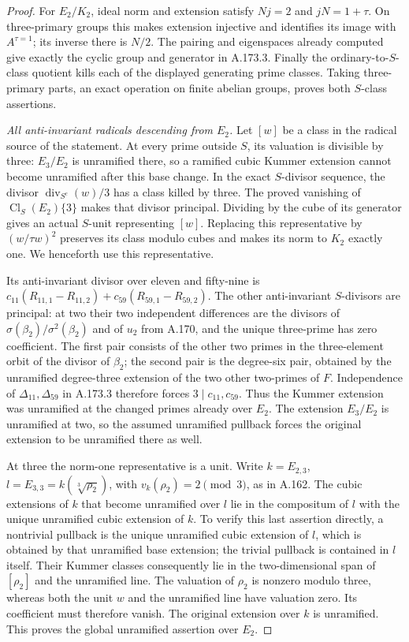 \begin{proof}
For \(E_2/K_2\), ideal norm and extension satisfy
\(Nj=2\) and \(jN=1+\tau\).  On three-primary groups this
makes extension injective and identifies its image with
\(A^{\tau=1}\); its inverse there is \(N/2\).
The pairing and eigenspaces already computed give exactly
the cyclic group and generator in A.173.3.
Finally the ordinary-to-\(S\)-class quotient kills each of
the displayed generating prime classes.  Taking three-primary
parts, an exact operation on finite abelian groups, proves
both \(S\)-class assertions.

\emph{All anti-invariant radicals descending from \(E_2\).}
Let \([w]\) be a class in the radical source of the statement.
At every prime outside \(S\), its valuation is divisible by
three: \(E_3/E_2\) is unramified there, so a ramified cubic
Kummer extension cannot become unramified after this base
change.  In the exact \(S\)-divisor sequence, the divisor
\(\operatorname{div}_{S^c}(w)/3\) has a class killed by three.
The proved vanishing of \(\operatorname{Cl}_S(E_2)\{3\}\)
makes that divisor principal.  Dividing by the cube of its
generator gives an actual \(S\)-unit representing \([w]\).
Replacing this representative by \((w/\tau w)^2\) preserves
its class modulo cubes and makes its norm to \(K_2\) exactly
one.  We henceforth use this representative.

Its anti-invariant divisor over eleven and fifty-nine is
\(c_{11}(R_{11,1}-R_{11,2})+
  c_{59}(R_{59,1}-R_{59,2})\).
The other anti-invariant \(S\)-divisors are principal:
at two their two independent differences are the divisors
of \(\sigma(\beta_2)/\sigma^2(\beta_2)\) and of \(u_2\)
from A.170, and the unique three-prime has zero coefficient.
The first pair consists of the other two primes in the
three-element orbit of the divisor of \(\beta_2\); the
second pair is the degree-six pair, obtained by the unramified
degree-three extension of the two other two-primes of \(F\).
Independence of \(\Delta_{11},\Delta_{59}\) in A.173.3
therefore forces \(3\mid c_{11},c_{59}\).
Thus the Kummer extension was unramified at the changed
primes already over \(E_2\).  The extension \(E_3/E_2\) is
unramified at two, so the assumed unramified pullback forces
the original extension to be unramified there as well.

At three the norm-one representative is a unit.  Write
\(k=E_{2,3}\), \(l=E_{3,3}=k(\sqrt[3]{\rho_2})\), with
\(v_k(\rho_2)=2\pmod3\), as in A.162.
The cubic extensions of \(k\) that become unramified over
\(l\) lie in the compositum of \(l\) with the unique
unramified cubic extension of \(k\).
To verify this last assertion directly, a nontrivial pullback
is the unique unramified cubic extension of \(l\), which
is obtained by that unramified base extension; the trivial
pullback is contained in \(l\) itself.
Their Kummer classes consequently lie in the two-dimensional
span of \([\rho_2]\) and the unramified line.
The valuation of \(\rho_2\) is nonzero modulo three, whereas
both the unit \(w\) and the unramified line have valuation
zero.  Its coefficient must therefore vanish.  The original
extension over \(k\) is unramified.  This proves the global
unramified assertion over \(E_2\).


\end{proof}
